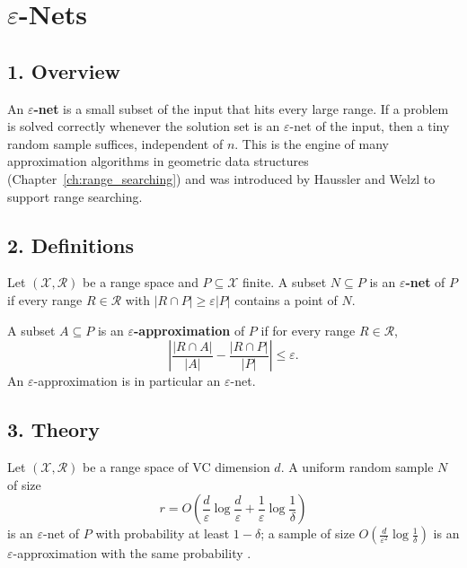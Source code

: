 \section{\texorpdfstring{$\varepsilon$}{epsilon}-Nets}
\label{sec:randomized_eps_nets}

\subsection{1. Overview}

An \textbf{$\varepsilon$-net} is a small subset of the input
that hits every large range. If a problem is solved correctly whenever the
solution set is an $\varepsilon$-net of the input, then a tiny random sample
suffices, independent of $n$. This is the engine of many approximation
algorithms in geometric data structures (Chapter~\ref{ch:range_searching}) and
was introduced by Haussler and Welzl \cite{hausslerwelzl1987} to support range
searching.

\subsection{2. Definitions}

\begin{definition}\label{def:rand_eps_net}
  Let $(\mathcal{X}, \mathcal{R})$ be a range space and $P \subseteq
  \mathcal{X}$ finite. A subset $N \subseteq P$ is an \textbf{$\varepsilon$-net}
  of $P$ if every range $R \in \mathcal{R}$ with $|R \cap P| \ge \varepsilon
  |P|$ contains a point of $N$.
\end{definition}

\begin{definition}\label{def:rand_eps_approximation}
  A subset $A \subseteq P$ is an \textbf{$\varepsilon$-approximation} of $P$ if
  for every range $R \in \mathcal{R}$,
  \[
    \left| \frac{|R \cap A|}{|A|} - \frac{|R \cap P|}{|P|} \right| \le
    \varepsilon.
  \]
  An $\varepsilon$-approximation is in particular an $\varepsilon$-net.
\end{definition}

\subsection{3. Theory}

\begin{theorem}\label{thm:rand_eps_net_small}
  Let $(\mathcal{X}, \mathcal{R})$ be a range space of VC dimension $d$. A
  uniform random sample $N$ of size
  \[
    r = O\!\left( \frac{d}{\varepsilon}\log\frac{d}{\varepsilon} +
    \frac{1}{\varepsilon}\log\frac{1}{\delta} \right)
  \]
  is an $\varepsilon$-net of $P$ with probability at least $1 - \delta$; a
  sample of size $O(\frac{d}{\varepsilon^2}\log\frac{1}{\delta})$ is an
  $\varepsilon$-approximation with the same probability
  \cite{hausslerwelzl1987}.
\end{theorem}

